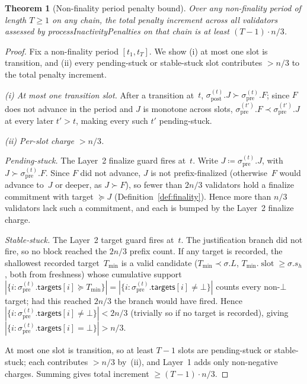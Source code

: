 \ifx\litemode\undefined\documentclass{article}\fi
\newcommand{\slot}[0]{\ensuremath{\operatorname{\mathrm{slot}}}}
\newcommand{\targets}{\mathsf{targets}}
\newcommand{\processInactivityPenalties}{\textsf{processInactivityPenalties}\xspace}
\theoremstyle{plain}
\newtheorem{theorem}{Theorem}
\theoremstyle{definition}
\theoremstyle{remark}
\begin{document}
\begin{theorem}[Non-finality period penalty bound]\label{thm:tightness}
Over any non-finality period of length $T \geq 1$ on any chain, the total penalty increment across all validators assessed by \processInactivityPenalties on that chain is at least $(T - 1) \cdot n/3$.
\end{theorem}

\begin{proof}
Fix a non-finality period $[t_1, t_T]$.
We show (i) at most one slot is transition, and (ii) every pending-stuck or stable-stuck slot contributes $> n/3$ to the total penalty increment.

\emph{(i) At most one transition slot.}
After a transition at~$t$, $\sigma_{\mathrm{post}}^{(t)}.J \succ \sigma_{\mathrm{pre}}^{(t)}.F$; since $F$ does not advance in the period and $J$ is monotone across slots, $\sigma_{\mathrm{pre}}^{(t')}.F \prec \sigma_{\mathrm{pre}}^{(t')}.J$ at every later $t' > t$, making every such $t'$ pending-stuck.

\emph{(ii) Per-slot charge $> n/3$.}

\emph{Pending-stuck.} The Layer~2 finalize guard fires at~$t$.
Write $J \coloneqq \sigma_{\mathrm{pre}}^{(t)}.J$, with $J \succ \sigma_{\mathrm{pre}}^{(t)}.F$.
Since $F$ did not advance, $J$ is not prefix-finalized (otherwise~$F$ would advance to~$J$ or deeper, as $J \succ F$), so fewer than $2n/3$ validators hold a finalize commitment with target $\succeq J$ (Definition~\ref{def:finality}).
Hence more than $n/3$ validators lack such a commitment, and each is bumped by the Layer~2 finalize charge.

\emph{Stable-stuck.} The Layer~2 target guard fires at~$t$.
The justification branch did not fire, so no block reached the $2n/3$ prefix count.
If any target is recorded, the shallowest recorded target~$T_{\min}$ is a valid candidate ($T_{\min} \prec \sigma.L$, $T_{\min}.\slot \geq \sigma.s_h$, both from freshness) whose cumulative support $|\{i : \sigma_{\mathrm{pre}}^{(t)}.\targets[i] \succeq T_{\min}\}| = |\{i : \sigma_{\mathrm{pre}}^{(t)}.\targets[i] \neq \bot\}|$ counts every non-$\bot$ target; had this reached $2n/3$ the branch would have fired.
Hence $|\{i : \sigma_{\mathrm{pre}}^{(t)}.\targets[i] \neq \bot\}| < 2n/3$ (trivially so if no target is recorded), giving $|\{i : \sigma_{\mathrm{pre}}^{(t)}.\targets[i] = \bot\}| > n/3$.

At most one slot is transition, so at least $T - 1$ slots are pending-stuck or stable-stuck; each contributes $> n/3$ by~(ii), and Layer~1 adds only non-negative charges.
Summing gives total increment $\geq (T-1) \cdot n/3$.
\end{proof}
\end{document}
